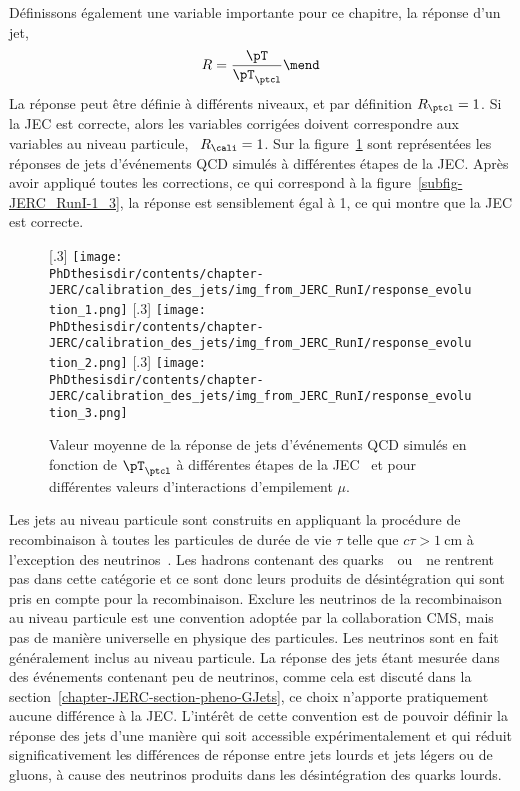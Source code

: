 Définissons également une variable importante pour ce chapitre, la réponse d'un jet,
\begin{equation}
R = \frac{\pT}{\pT_\ptcl}
\mend
\end{equation}
La réponse peut être définie à différents niveaux, et par définition $R_\ptcl=1$.
Si la JEC est correcte, alors les variables corrigées doivent correspondre aux variables au niveau particule, \ie\ $R_\cali=1$.
Sur la figure~\ref{fig-JERC_RunI-1} sont représentées les réponses de jets d'événements QCD simulés à différentes étapes de la JEC. Après avoir appliqué toutes les corrections, ce qui correspond à la figure~\ref{subfig-JERC_RunI-1_3}, la réponse est sensiblement égal à 1, ce qui montre que la JEC est correcte.
\begin{figure}[h]
\centering
{}[.3\textwidth]
{\texttt{[image: \\PhDthesisdir/contents/chapter-JERC/calibration\_des\_jets/img\_from\_JERC\_RunI/response\_evolution\_1.png]}}
\hfill
{}[.3\textwidth]
{\texttt{[image: \\PhDthesisdir/contents/chapter-JERC/calibration\_des\_jets/img\_from\_JERC\_RunI/response\_evolution\_2.png]}}
\hfill
{}[.3\textwidth]
{\texttt{[image: \\PhDthesisdir/contents/chapter-JERC/calibration\_des\_jets/img\_from\_JERC\_RunI/response\_evolution\_3.png]}}
\caption[Valeur moyenne de la réponse de jets d'événements QCD simulés.]{Valeur moyenne de la réponse de jets d'événements QCD simulés en fonction de $\pT_\ptcl$ à différentes étapes de la JEC~\cite{JERC_RunI} et pour différentes valeurs d'interactions d'empilement $\mu$.}
\label{fig-JERC_RunI-1}
\end{figure}
\par Les jets au niveau particule sont construits en appliquant la procédure de recombinaison à toutes les particules de durée de vie $\tau$ telle que $c\tau>\SI{1}{\centi\meter}$ à l'exception des neutrinos~\cite{JERC_RunI}.
Les hadrons contenant des quarks~\quarkc\ ou~\quarkb\ ne rentrent pas dans cette catégorie et ce sont donc leurs produits de désintégration qui sont pris en compte pour la recombinaison.
Exclure les neutrinos de la recombinaison au niveau particule est une convention adoptée par la collaboration CMS, mais pas de manière universelle en physique des particules.
Les neutrinos sont en fait généralement inclus au niveau particule.
La réponse des jets étant mesurée dans des événements contenant peu de neutrinos, comme cela est discuté dans la section~\ref{chapter-JERC-section-pheno-GJets}, ce choix n'apporte pratiquement aucune différence à la JEC.
L'intérêt de cette convention est de pouvoir définir la réponse des jets d'une manière qui soit accessible expérimentalement et qui réduit significativement les différences de réponse entre jets lourds et jets légers ou de gluons, à cause des neutrinos produits dans les désintégration des quarks lourds.
